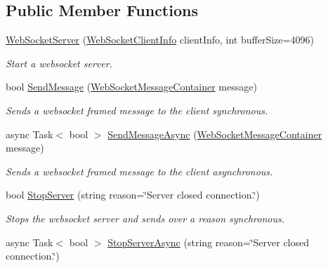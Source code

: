 \subsection*{Public Member Functions}
\begin{DoxyCompactItemize}
\item 
\mbox{\hyperlink{class_simple_web_socket_server_library_1_1_w_socket_server_1_1_web_socket_server_a4162571a5f4e62f103082ed52cba9566}{Web\+Socket\+Server}} (\mbox{\hyperlink{class_simple_web_socket_server_library_1_1_web_socket_client_info}{Web\+Socket\+Client\+Info}} client\+Info, int buffer\+Size=4096)
\begin{DoxyCompactList}\small\item\em Start a websocket server. \end{DoxyCompactList}\item 
bool \mbox{\hyperlink{class_simple_web_socket_server_library_1_1_w_socket_server_1_1_web_socket_server_ab8f08517c5288c0ae1f18db7f12379c6}{Send\+Message}} (\mbox{\hyperlink{class_simple_web_socket_server_library_1_1_web_socket_message_container}{Web\+Socket\+Message\+Container}} message)
\begin{DoxyCompactList}\small\item\em Sends a websocket framed message to the client synchronous. \end{DoxyCompactList}\item 
async Task$<$ bool $>$ \mbox{\hyperlink{class_simple_web_socket_server_library_1_1_w_socket_server_1_1_web_socket_server_aee6acd7a909b4f9376cb3896484a24b5}{Send\+Message\+Async}} (\mbox{\hyperlink{class_simple_web_socket_server_library_1_1_web_socket_message_container}{Web\+Socket\+Message\+Container}} message)
\begin{DoxyCompactList}\small\item\em Sends a websocket framed message to the client asynchronous. \end{DoxyCompactList}\item 
bool \mbox{\hyperlink{class_simple_web_socket_server_library_1_1_w_socket_server_1_1_web_socket_server_a20756f37e37a07b424764d14cfdd9f6b}{Stop\+Server}} (string reason=\char`\"{}Server closed connection.\char`\"{})
\begin{DoxyCompactList}\small\item\em Stops the websocket server and sends over a reason synchronous. \end{DoxyCompactList}\item 
async Task$<$ bool $>$ \mbox{\hyperlink{class_simple_web_socket_server_library_1_1_w_socket_server_1_1_web_socket_server_a8fc32773b77146e5380e4d932b5b3511}{Stop\+Server\+Async}} (string reason=\char`\"{}Server closed connection.\char`\"{})

\end{DoxyCompactItemize}
